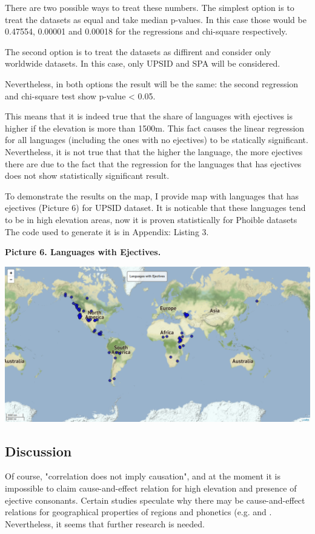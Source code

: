 \documentclass[a4paper,12pt]{article}
\begin{document}
There are two possible ways to treat these numbers. The simplest option is to treat the datasets as equal and take median p-values. In this case those would be 0.47554, 0.00001 and 0.00018 for the regressions and chi-square respectively.

The second option is to treat the datasets as diffirent and consider only worldwide datasets. In this case, only UPSID and SPA will be considered.

Nevertheless, in both options the result will be the same: the second regression and chi-square test show p-value < 0.05.

This means that it is indeed true that the share of languages with ejectives is higher if the elevation is more than 1500m. This fact causes the linear regression for all languages (including the ones with no ejectives) to be statically significant. Nevertheless, it is not true that that the higher the language, the more ejectives there are due to the fact that the regression for the languages that has ejectives does not show statistically significant result.

To demonstrate the results on the map, I provide map with languages that has ejectives (Picture 6) for UPSID dataset. It is noticable that these languages tend to be in high elevation areas, now it is proven statistically for Phoible datasets The code used to generate it is in Appendix: Listing 3.

\textbf{Picture 6. Languages with Ejectives.}

\includegraphics[width=\textwidth]{images/picture6.png}

\subsection{Discussion}

Of course, "correlation does not imply causation", and at the moment it is impossible to claim cause-and-effect relation for high elevation and presence of ejective consonants. Certain studies speculate why there may be cause-and-effect relations for geographical properties of regions and phonetics (e.g. \parencite{ejectives} and \parencite{climatesSonorants}. Nevertheless, it seems that further research is needed.\
\end{document}
